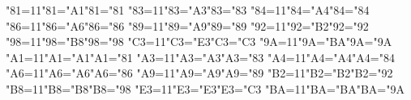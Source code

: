 \def\ltletters{
\catcode"81=11\lccode"81="A1\uccode"81="81%
\catcode"83=11\lccode"83="A3\uccode"83="83%
\catcode"84=11\lccode"84="A4\uccode"84="84%
\catcode"86=11\lccode"86="A6\uccode"86="86%
\catcode"89=11\lccode"89="A9\uccode"89="89%
\catcode"92=11\lccode"92="B2\uccode"92="92%
\catcode"98=11\lccode"98="B8\uccode"98="98%
\catcode"C3=11\lccode"C3="E3\uccode"C3="C3%
\catcode"9A=11\lccode"9A="BA\uccode"9A="9A%
%
\catcode"A1=11\lccode"A1="A1\uccode"A1="81%
\catcode"A3=11\lccode"A3="A3\uccode"A3="83%
\catcode"A4=11\lccode"A4="A4\uccode"A4="84%
\catcode"A6=11\lccode"A6="A6\uccode"A6="86%
\catcode"A9=11\lccode"A9="A9\uccode"A9="89%
\catcode"B2=11\lccode"B2="B2\uccode"B2="92%
\catcode"B8=11\lccode"B8="B8\uccode"B8="98%
\catcode"E3=11\lccode"E3="E3\uccode"E3="C3%
\catcode"BA=11\lccode"BA="BA\uccode"BA="9A%
}
\ltletters
